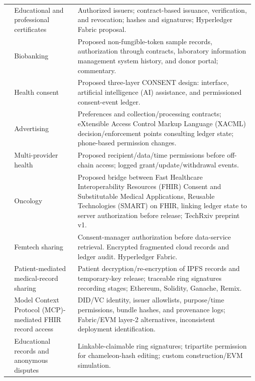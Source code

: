 \begin{longtable}{@{}>{\raggedright\arraybackslash}m{}>{\raggedright\arraybackslash}m{}>{\raggedright\arraybackslash}m{}@{}}
\addlinespace[5pt]
\cite{updateGupta2024CertificatePermission} & Educational and professional certificates & Authorized issuers; contract-based issuance, verification, and revocation; hashes and signatures; Hyperledger Fabric proposal. \\
\addlinespace[5pt]
\cite{updateBarnes2025DemonstratedConsent} & Biobanking & Proposed non-fungible-token sample records, authorization through contracts, laboratory information management system history, and donor portal; commentary. \\
\addlinespace[5pt]
\cite{updateBonotis2025CONSENT} & Health consent & Proposed three-layer CONSENT design: interface, artificial intelligence (AI) assistance, and permissioned consent-event ledger. \\
\addlinespace[5pt]
\cite{updateDauden2025RTBConsent} & Advertising & Preferences and collection/processing contracts; eXtensible Access Control Markup Language (XACML) decision/enforcement points consulting ledger state; phone-based permission changes. \\
\addlinespace[5pt]
\cite{updateObodo2025MultiProviderConsent} & Multi-provider health & Proposed recipient/data/time permissions before off-chain access; logged grant/update/withdrawal events. \\
\addlinespace[5pt]
\cite{updateOke2025FHIRConsent} & Oncology & Proposed bridge between Fast Healthcare Interoperability Resources (FHIR) Consent and Substitutable Medical Applications, Reusable Technologies (SMART) on FHIR, linking ledger state to server authorization before release; TechRxiv preprint v1. \\
\addlinespace[5pt]
\cite{updateTomaz2025PrivacHer} & Femtech sharing & Consent-manager authorization before data-service retrieval. Encrypted fragmented cloud records and ledger audit. Hyperledger Fabric. \\
\addlinespace[5pt]
\cite{updateQu2025ConsentEMR} & Patient-mediated medical-record sharing & Patient decryption/re-encryption of IPFS records and temporary-key release; traceable ring signatures recording stages; Ethereum, Solidity, Ganache, Remix. \\
\addlinespace[5pt]
\cite{updateFerreira2025MCPFHIR} & Model Context Protocol (MCP)-mediated FHIR record access & DID/VC identity, issuer allowlists, purpose/time permissions, bundle hashes, and provenance logs; Fabric/EVM layer-2 alternatives, inconsistent deployment identification. \\
\addlinespace[5pt]
\cite{updateLu2025RedactableEducation} & Educational records and anonymous disputes & Linkable-claimable ring signatures; tripartite permission for chameleon-hash editing; custom construction/EVM simulation. \\

\end{longtable}
